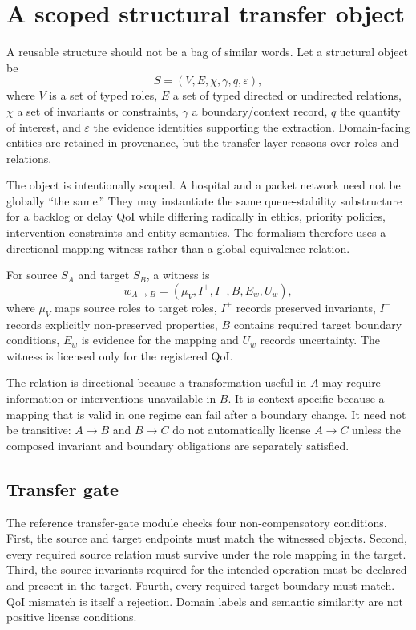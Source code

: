 \section{A scoped structural transfer object}

A reusable structure should not be a bag of similar words. Let a structural object be
\[
S=(V,E,\chi,\gamma,q,\varepsilon),
\]
where $V$ is a set of typed roles, $E$ a set of typed directed or undirected relations, $\chi$ a set of invariants or constraints, $\gamma$ a boundary/context record, $q$ the quantity of interest, and $\varepsilon$ the evidence identities supporting the extraction. Domain-facing entities are retained in provenance, but the transfer layer reasons over roles and relations.

The object is intentionally scoped. A hospital and a packet network need not be globally ``the same.'' They may instantiate the same queue-stability substructure for a backlog or delay QoI while differing radically in ethics, priority policies, intervention constraints and entity semantics. The formalism therefore uses a directional mapping witness rather than a global equivalence relation.

\begin{definition}
For source $S_A$ and target $S_B$, a witness is
\[
w_{A\to B}=(\mu_V,I^+,I^-,B,E_w,U_w),
\]
where $\mu_V$ maps source roles to target roles, $I^+$ records preserved invariants, $I^-$ records explicitly non-preserved properties, $B$ contains required target boundary conditions, $E_w$ is evidence for the mapping and $U_w$ records uncertainty. The witness is licensed only for the registered QoI.
\end{definition}

The relation is directional because a transformation useful in $A$ may require information or interventions unavailable in $B$. It is context-specific because a mapping that is valid in one regime can fail after a boundary change. It need not be transitive: $A\to B$ and $B\to C$ do not automatically license $A\to C$ unless the composed invariant and boundary obligations are separately satisfied.

\subsection{Transfer gate}

The reference transfer-gate module checks four non-compensatory conditions. First, the source and target endpoints must match the witnessed objects. Second, every required source relation must survive under the role mapping in the target. Third, the source invariants required for the intended operation must be declared and present in the target. Fourth, every required target boundary must match. QoI mismatch is itself a rejection. Domain labels and semantic similarity are not positive license conditions.

